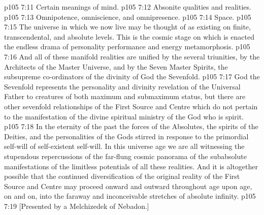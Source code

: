 \vs p105 7:11 \bibnobreakspace Certain meanings of mind.
\vs p105 7:12 \bibnobreakspace Absonite qualities and realities.
\vs p105 7:13 \bibnobreakspace Omnipotence, omniscience, and omnipresence.
\vs p105 7:14 \bibnobreakspace Space.
\vs p105 7:15 \pc The universe in which we now live may be thought of as existing on finite, transcendental, and absolute levels. This is the cosmic stage on which is enacted the endless drama of personality performance and energy metamorphosis.
\vs p105 7:16 And all of these manifold realities are unified  by the several triunities,  by the Architects of the Master Universe, and  by the Seven Master Spirits, the subsupreme co\hyp{}ordinators of the divinity of God the Sevenfold.
\vs p105 7:17 God the Sevenfold represents the personality and divinity revelation of the Universal Father to creatures of both maximum and submaximum status, but there are other sevenfold relationships of the First Source and Centre which do not pertain to the manifestation of the divine spiritual ministry of the God who is spirit.
\vs p105 7:18 \pc In the eternity of the past the forces of the Absolutes, the spirits of the Deities, and the personalities of the Gods stirred in response to the primordial self\hyp{}will of self\hyp{}existent self\hyp{}will. In this universe age we are all witnessing the stupendous repercussions of the far\hyp{}flung cosmic panorama of the subabsolute manifestations of the limitless potentials of all these realities. And it is altogether possible that the continued diversification of the original reality of the First Source and Centre may proceed onward and outward throughout age upon age, on and on, into the faraway and inconceivable stretches of absolute infinity.
\vsetoff
\vs p105 7:19 [Presented by a Melchizedek of Nebadon.]
\quizlink
